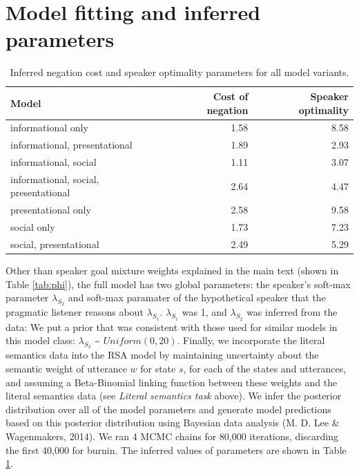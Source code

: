 \documentclass[oneside]{report}
\begin{document}
\section{Model fitting and inferred
parameters}\label{model-fitting-and-inferred-parameters}
\begin{table}[t]

\caption[Other inferred parameters for all model variants.]{\label{tab:otherParams}Inferred negation cost and speaker optimality parameters for all model variants.}
\centering
\begin{tabular}{lrr}
\toprule
\textbf{Model} & \textbf{Cost of negation} & \textbf{Speaker optimality}\\
\midrule
informational only & 1.58 & 8.58\\
informational, presentational & 1.89 & 2.93\\
informational, social & 1.11 & 3.07\\
informational, social, presentational & 2.64 & 4.47\\
presentational only & 2.58 & 9.58\\
\addlinespace
social only & 1.73 & 7.23\\
social, presentational & 2.49 & 5.29\\
\bottomrule
\end{tabular}
\end{table}
Other than speaker goal mixture weights explained in the main text
(shown in Table \ref{tab:phi}), the full model has two global
parameters: the speaker's soft-max parameter \(\lambda_{S_2}\) and
soft-max paramater of the hypothetical speaker that the pragmatic
listener reasons about \(\lambda_{S_1}\). \(\lambda_{S_1}\) was 1, and
\(\lambda_{S_2}\) was inferred from the data: We put a prior that was
consistent with those used for similar models in this model class:
\(\lambda_{S_2}\) \textasciitilde{} \(Uniform(0,20)\). Finally, we
incorporate the literal semantics data into the RSA model by maintaining
uncertainty about the semantic weight of utterance \(w\) for state
\(s\), for each of the states and utterances, and assuming a
Beta-Binomial linking function between these weights and the literal
semantics data (see \emph{Literal semantics task} above). We infer the
posterior distribution over all of the model parameters and generate
model predictions based on this posterior distribution using Bayesian
data analysis (M. D. Lee \& Wagenmakers, 2014). We ran 4 MCMC chains for
80,000 iterations, discarding the first 40,000 for burnin. The inferred
values of parameters are shown in Table \ref{tab:otherParams}.
\end{document}
